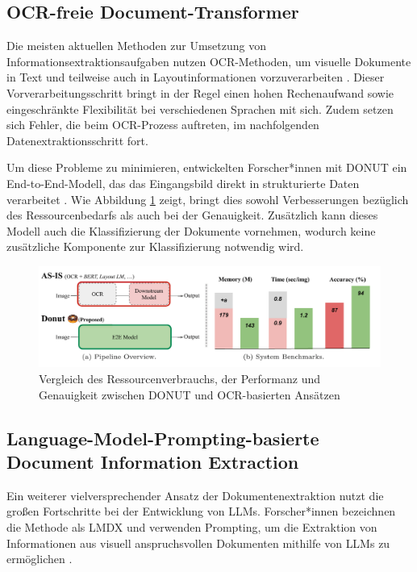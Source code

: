 \subsection{OCR-freie Document-Transformer}
\label{subsec:ocr-freie-document-transformer}

Die meisten aktuellen Methoden zur Umsetzung von Informationsextraktionsaufgaben nutzen \gls{OCR}-Methoden, um visuelle Dokumente in Text und teilweise auch in Layoutinformationen vorzuverarbeiten \parencite{KimGeewook2022ODUT}. Dieser Vorverarbeitungsschritt bringt in der Regel einen hohen Rechenaufwand sowie eingeschränkte Flexibilität bei verschiedenen Sprachen mit sich. Zudem setzen sich Fehler, die beim \gls{OCR}-Prozess auftreten, im nachfolgenden Datenextraktionsschritt fort.

Um diese Probleme zu minimieren, entwickelten Forscher*innen mit \gls{DONUT} ein End-to-End-Modell, das das Eingangsbild direkt in strukturierte Daten verarbeitet \parencite{KimGeewook2022ODUT}. Wie Abbildung \ref{fig:donut-comparison} zeigt, bringt dies sowohl Verbesserungen bezüglich des Ressourcenbedarfs als auch bei der Genauigkeit. Zusätzlich kann dieses Modell auch die Klassifizierung der Dokumente vornehmen, wodurch keine zusätzliche Komponente zur Klassifizierung notwendig wird.

\begin{figure}[htb]
	\centering
	\includegraphics[width=\textwidth]{images/Donut_comparison.png}
	\caption{Vergleich des Ressourcenverbrauchs, der Performanz und Genauigkeit zwischen \gls{DONUT} und \gls{OCR}-basierten Ansätzen \parencite{KimGeewook2022ODUT}}
	\label{fig:donut-comparison}
\end{figure}

\subsection{Language-Model-Prompting-basierte Document Information Extraction}
\label{subsec:language-model-basierte-document-information-extraction}

Ein weiterer vielversprechender Ansatz der Dokumentenextraktion nutzt die großen Fortschritte bei der Entwicklung von \glspl{LLM}. Forscher*innen bezeichnen die Methode als \gls{LMDX} und verwenden Prompting, um die Extraktion von Informationen aus visuell anspruchsvollen Dokumenten mithilfe von \glspl{LLM} zu ermöglichen \parencite{PerotVincent2024LLMD}.

